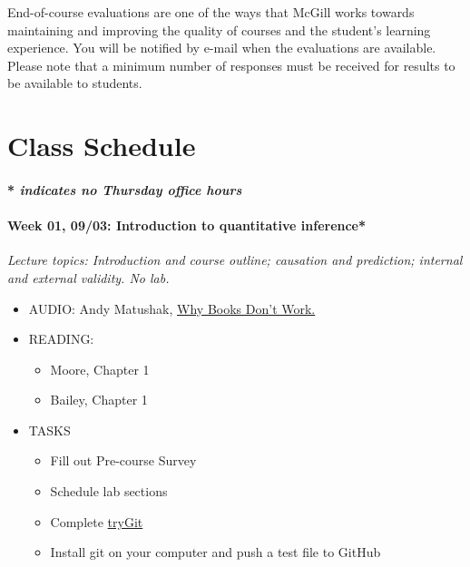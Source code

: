 \documentclass[11pt]{article}
\providecommand{\tightlist}{%
  \setlength{\itemsep}{0pt}\setlength{\parskip}{0pt}}
\begin{document}
End-of-course evaluations are one of the ways that McGill works towards
maintaining and improving the quality of courses and the student's
learning experience. You will be notified by e-mail when the evaluations
are available. Please note that a minimum number of responses must be
received for results to be available to students. \newpage


\section{Class Schedule}
\vspace{4mm}

\paragraph{* \emph{indicates no Thursday office hours}}

\paragraph{Week 01, 09/03: Introduction to quantitative inference*\\}
\emph{Lecture topics: Introduction and course outline; causation and prediction; internal and external validity. No lab.}\\

\begin{itemize}
\tightlist
\item
  AUDIO: Andy Matushak,
  \href{http://www.econtalk.org/andy-matuschak-on-books-and-learning/}{Why
  Books Don't Work.}
\item
  READING:
  \begin{itemize}
  \tightlist
  \item
    Moore, Chapter 1
  \item
    Bailey, Chapter 1
  \end{itemize}
\item
  TASKS
  \begin{itemize}
  \tightlist
  \item
    Fill out Pre-course Survey
    \item   
    Schedule lab sections
  \item
    Complete \href{https://try.GitHub.io/levels/1/challenges/1}{tryGit}
  \item
    Install git on your computer and push a test file to GitHub
  \end{itemize}
\end{itemize}
\end{document}
